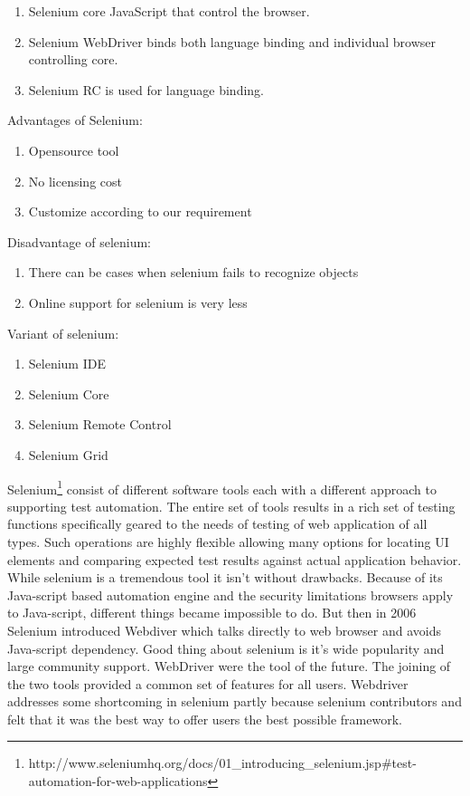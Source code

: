 \documentclass[article,type=msc,colorback,accentcolor=tud9c,twoside,11pt]{tudthesis}
\begin{document}
\begin{enumerate}
\item Selenium core JavaScript that control the browser.
\item Selenium WebDriver binds both language binding and individual browser controlling core.
\item Selenium RC is used for language binding.
\end{enumerate}

Advantages of Selenium:
\begin{enumerate}
\item Opensource tool
\item No licensing cost
\item Customize according to our requirement
\end{enumerate}

Disadvantage of selenium:
\begin{enumerate}
\item	There can be cases when selenium fails to recognize objects
\item Online support for selenium is very less
\end{enumerate}

Variant of selenium:
\begin{enumerate}
\item Selenium IDE
\item Selenium Core
\item Selenium Remote Control
\item Selenium Grid
\end{enumerate}

Selenium\footnote{http://www.seleniumhq.org/docs/01\_introducing\_selenium.jsp\#test-automation-for-web-applications} consist of different software tools each with a different approach to supporting test automation. The entire set of tools results in a rich set of testing functions specifically geared to the needs of testing of web application of all types. Such operations are highly flexible allowing many options for locating UI elements and comparing expected test results against actual application behavior. While selenium is a tremendous tool it isn't without drawbacks. Because of its Java-script based automation engine and the security limitations browsers apply to Java-script, different things became impossible to do. But then in 2006 Selenium introduced Webdiver which talks directly to web browser and avoids Java-script dependency. Good thing about selenium is it's wide popularity and large community support. WebDriver were the tool of the future. The joining of the two tools provided a common set of features for all users. Webdriver addresses some shortcoming in selenium partly because selenium contributors and felt that it was the best way to offer users the best possible framework.
\end{document}
